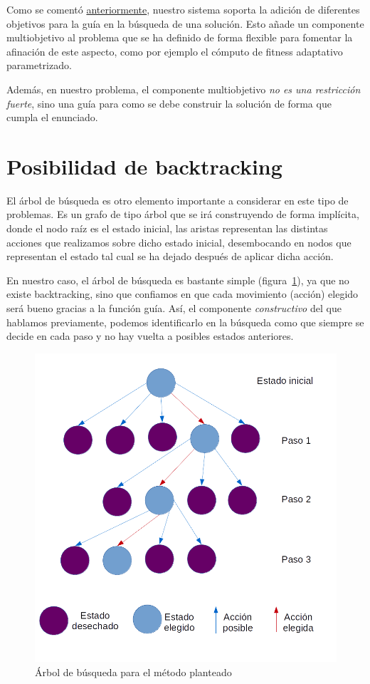 Como se comentó \hyperref[fitmultsec]{anteriormente}, nuestro sistema soporta la adición de diferentes objetivos para la guía en la búsqueda de una solución. Esto añade un componente multiobjetivo al problema que se ha definido de forma flexible para fomentar la afinación de este aspecto, como por ejemplo el cómputo de fitness adaptativo parametrizado.

Además, en nuestro problema, el componente multiobjetivo \emph{no es una restricción fuerte}, sino una guía para como se debe construir la solución de forma que cumpla el enunciado.

\section{Posibilidad de backtracking}

El árbol de búsqueda es otro elemento importante a considerar en este tipo de problemas. Es un grafo de tipo árbol que se irá construyendo de forma implícita, donde el nodo raíz es el estado inicial, las aristas representan las distintas acciones que realizamos sobre dicho estado inicial, desembocando en nodos que representan el estado tal cual se ha dejado después de aplicar dicha acción.

En nuestro caso, el árbol de búsqueda es bastante simple (figura~\ref{fig:searchtree}), ya que no existe backtracking, sino que confiamos en que cada movimiento (acción) elegido será bueno gracias a la función guía. Así, el componente \emph{constructivo} del que hablamos previamente, podemos identificarlo en la búsqueda como que siempre se decide en cada paso y no hay vuelta a posibles estados anteriores.

\begin{figure}[t]
\centering
\includegraphics[scale=0.5]{img/arbol-busqueda}
\caption{Árbol de búsqueda para el método planteado
\label{fig:searchtree}}
\end{figure}

